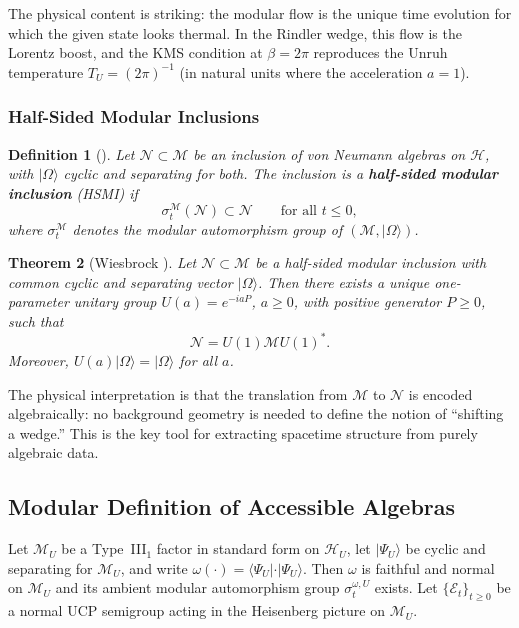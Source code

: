 \documentclass[12pt,a4paper,openany]{book}
\newtheorem{theorem}{Theorem}[chapter]
\newtheorem{definition}[theorem]{Definition}
\begin{document}
The physical content is striking: the modular flow is the unique time evolution for which the given state looks thermal.
In the Rindler wedge, this flow is the Lorentz boost, and the KMS condition at $\beta = 2\pi$ reproduces the Unruh temperature $T_U = (2\pi)^{-1}$ (in natural units where the acceleration $a = 1$).

\subsubsection{Half-Sided Modular Inclusions}

\begin{definition}[{\cite{Wiesbrock1993}}]
Let $\mathcal{N} \subset \mathcal{M}$ be an inclusion of von Neumann algebras on $\mathcal{H}$, with $|\Omega\rangle$ cyclic and separating for both.
The inclusion is a \textbf{half-sided modular inclusion} (HSMI) if
\begin{equation}
\sigma_t^{\mathcal{M}}(\mathcal{N}) \subset \mathcal{N} \qquad \text{for all } t \leq 0,
\end{equation}
where $\sigma_t^{\mathcal{M}}$ denotes the modular automorphism group of $(\mathcal{M}, |\Omega\rangle)$.
\end{definition}

\begin{theorem}[Wiesbrock {\cite{Wiesbrock1993}}]
\label{D-thm:Wiesbrock}
Let $\mathcal{N} \subset \mathcal{M}$ be a half-sided modular inclusion with common cyclic and separating vector $|\Omega\rangle$.
Then there exists a unique one-parameter unitary group $U(a) = e^{-iaP}$, $a \geq 0$, with positive generator $P \geq 0$, such that
\begin{equation}
\mathcal{N} = U(1)\mathcal{M} U(1)^*.
\end{equation}
Moreover, $U(a)|\Omega\rangle = |\Omega\rangle$ for all $a$.
\end{theorem}

The physical interpretation is that the translation from $\mathcal{M}$ to $\mathcal{N}$ is encoded algebraically: no background geometry is needed to define the notion of ``shifting a wedge.''
This is the key tool for extracting spacetime structure from purely algebraic data.


\subsection{Modular Definition of Accessible Algebras}
\label{D-sec:modular-def}

Let $\mathcal M_U$ be a Type~III$_1$ factor in standard form on $\mathcal H_U$, let $|\Psi_U\rangle$ be cyclic and separating for $\mathcal M_U$, and write $\omega(\cdot)=\langle\Psi_U|\cdot|\Psi_U\rangle$.  Then $\omega$ is faithful and normal on $\mathcal M_U$ and its ambient modular automorphism group $\sigma_t^{\omega,U}$ exists.  Let $\{\mathcal E_t\}_{t\ge0}$ be a normal UCP semigroup acting in the Heisenberg picture on $\mathcal M_U$.
\end{document}
